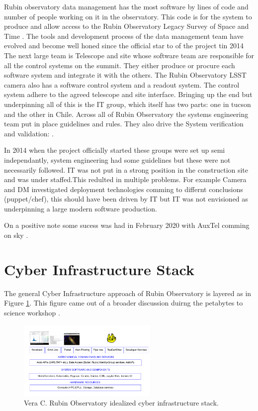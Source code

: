 Rubin observatory  data management \citep{2015arXiv151207914J} has the most software by lines of code and number of people working on it in the observatory. This code is for the system to produce and allow access to the Rubin Observatory Legacy Survey of Space and Time \cite{LSE-163}.
The tools and development process of the data management team have evolved and become well honed since the official star to of the project tin 2014 \citep{2018SPIE10707E..09J}
The next large team is  Telescope and site  \citep{2014SPIE.9145E..1AG} whose software team are responsible for all the control systems on the summit. They either produce or procure each software system and integrate it with the others.
The Rubin Observatory LSST camera \citep{2010SPIE.7735E..0JK} also has a software control system and a readout system. The control system adhere to the agreed telescope and site interface.
 Bringing up the end but underpinning all of this is the IT group, which itself has two parts: one in tucson and the other in Chile.
 Across all of Rubin Observatory the systems engineering team \citep{2014SPIE.9150E..0MC} put in place guidelines and rules. They also drive the  System verification and validation: \citep{2014SPIE.9150E..0NS}.

In 2014 when the project officially started these groups were set up semi independantly, system engineering had some guidelines but these were not necessarily followed. IT was not put in a strong position in the construction site and was under staffed.This redulted in multiple problems. For example Camera and DM investigated deployment technologies comming to differnt conclusions (puppet/chef), this should have been driven by IT but IT was not envisioned as underpinning a large  modern software production.

On a positive note some sucess was had in February 2020 with AuxTel comming on sky \citep{Ingraham20}.


\section {Cyber Infrastructure Stack} \label{sect:cis}

The general Cyber Infrastructure approach of Rubin Observatory is layered as in Figure \ref{fig:ci}.
This figure came out of a broader discussion duirng the petabytes to science workshop \citep{2019arXiv190505116B}.


\begin{figure}
\includegraphics[width=0.6\textwidth]{CI-LSST}
\caption{Vera C. Rubin Observatory idealized cyber infrastructure stack. \label{fig:ci}}
\end{figure}

